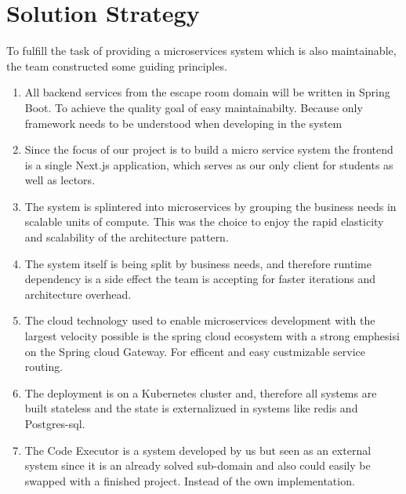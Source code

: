 \hypertarget{section-solution-strategy}{%
\section{Solution Strategy}\label{section-solution-strategy}}

To fulfill the task of providing a microservices system which is also maintainable, the team constructed some guiding principles.

\begin{enumerate}
    \item All backend services from the escape room domain will be written in Spring Boot. To achieve the quality goal of easy maintainabilty. Because only framework needs to be understood when developing in the system
    \item Since the focus of our project is to build a micro service system the frontend is a single Next.js application, which serves as our only client for students as well as lectors.
    \item The system is splintered into microservices by grouping the business needs in scalable units of compute. This was the choice to enjoy the rapid elasticity and scalability of the architecture pattern. 
    \item The system itself is being split by business needs, and therefore runtime dependency is a side effect the team is accepting for faster iterations and architecture overhead.
    \item The cloud technology used to enable microservices development with the largest velocity possible is the spring cloud ecosystem with a strong emphesisi on the Spring cloud Gateway. For efficent  and easy custmizable service routing.
    \item The deployment is on a Kubernetes cluster and, therefore all systems are built stateless and the state is externalizued in systems like redis and Postgres-sql. 
    \item The Code Executor is a system developed by us but seen as an external system since it is an already solved sub-domain and also could easily be swapped with a finished project. Instead of the own implementation.
\end{enumerate}